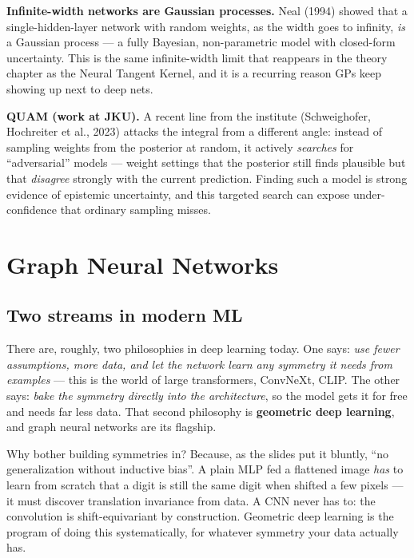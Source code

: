 \documentclass[11pt, oneside]{book}
\begin{document}
\textbf{Infinite-width networks are Gaussian processes.} Neal (1994) showed that a
single-hidden-layer network with random weights, as the width goes to infinity,
\emph{is} a Gaussian process --- a fully Bayesian, non-parametric model with
closed-form uncertainty. This is the same infinite-width limit that reappears in
the theory chapter as the Neural Tangent Kernel, and it is a recurring reason GPs
keep showing up next to deep nets.

\textbf{QUAM (work at JKU).} A recent line from the institute
(Schweighofer, Hochreiter et al., 2023) attacks the integral from a different
angle: instead of sampling weights from the posterior at random, it actively
\emph{searches} for ``adversarial'' models --- weight settings that the posterior
still finds plausible but that \emph{disagree} strongly with the current
prediction. Finding such a model is strong evidence of epistemic uncertainty, and
this targeted search can expose under-confidence that ordinary sampling misses.


\chapter{Graph Neural Networks}

\section{Two streams in modern ML}

There are, roughly, two philosophies in deep learning today. One says: \emph{use
fewer assumptions, more data, and let the network learn any symmetry it needs
from examples} --- this is the world of large transformers, ConvNeXt, CLIP. The
other says: \emph{bake the symmetry directly into the architecture}, so the model
gets it for free and needs far less data. That second philosophy is
\textbf{geometric deep learning}, and graph neural networks are its flagship.

Why bother building symmetries in? Because, as the slides put it bluntly,
``no generalization without inductive bias''. A plain MLP fed a flattened image
\emph{has} to learn from scratch that a digit is still the same digit when shifted
a few pixels --- it must discover translation invariance from data. A CNN never
has to: the convolution is shift-equivariant by construction. Geometric deep
learning is the program of doing this systematically, for whatever symmetry your
data actually has.
\end{document}
